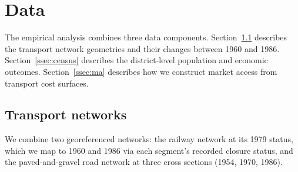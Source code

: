 %
%
%
%

\section{Data}
\label{sec:data}

The empirical analysis combines three data components. Section~\ref{ssec:networks}
describes the transport network geometries and their changes between
1960 and 1986. Section~\ref{ssec:census} describes the district-level
population and economic outcomes. Section~\ref{ssec:ma} describes how
we construct market access from transport cost surfaces.

\subsection{Transport networks}
\label{ssec:networks}

We combine two georeferenced networks: the railway network at its 1979
status, which we map to 1960 and 1986 via each segment's recorded closure
status, and the paved-and-gravel road network at three cross sections
(1954, 1970, 1986).

